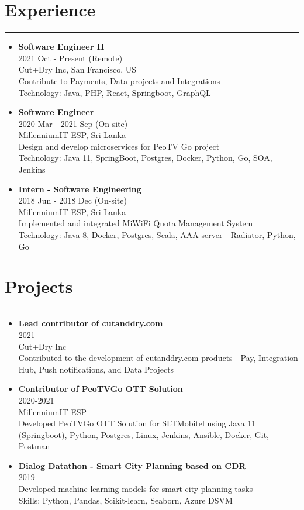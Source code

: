 \documentclass[a4paper,10pt]{article}
\newcommand{\ressection}[1]{\section*{#1}\vspace{-0.5em}\hrule\vspace{0.5em}}
\newenvironment{myitemize}
  {\begin{itemize}[left=0pt,label=,itemsep=5pt]}
  {\end{itemize}}
\begin{document}
\ressection{Experience}
\begin{myitemize}
    \item \textbf{Software Engineer II} \\
          2021 Oct - Present (Remote) \\
          Cut+Dry Inc, San Francisco, US \\
          Contribute to Payments, Data projects and Integrations \\
          Technology: Java, PHP, React, Springboot, GraphQL
    \item \textbf{Software Engineer} \\
          2020 Mar - 2021 Sep (On-site) \\
          MillenniumIT ESP, Sri Lanka \\
          Design and develop microservices for PeoTV Go project \\
          Technology: Java 11, SpringBoot, Postgres, Docker, Python, Go, SOA, Jenkins
    \item \textbf{Intern - Software Engineering} \\
          2018 Jun - 2018 Dec (On-site) \\
          MillenniumIT ESP, Sri Lanka \\
          Implemented and integrated MiWiFi Quota Management System \\
          Technology: Java 8, Docker, Postgres, Scala, AAA server - Radiator, Python, Go
\end{myitemize}

\ressection{Projects}
\begin{myitemize}
    \item \textbf{Lead contributor of cutanddry.com} \\
          2021 \\
          Cut+Dry Inc \\
          Contributed to the development of cutanddry.com products - Pay, Integration Hub, Push notifications, and Data Projects
    \item \textbf{Contributor of PeoTVGo OTT Solution} \\
          2020-2021 \\
          MillenniumIT ESP \\
          Developed PeoTVGo OTT Solution for SLTMobitel using Java 11 (Springboot), Python, Postgres, Linux, Jenkins, Ansible, Docker, Git, Postman
    \item \textbf{Dialog Datathon - Smart City Planning based on CDR} \\
          2019 \\
          Developed machine learning models for smart city planning tasks \\
          Skills: Python, Pandas, Scikit-learn, Seaborn, Azure DSVM
\end{myitemize}
\end{document}
